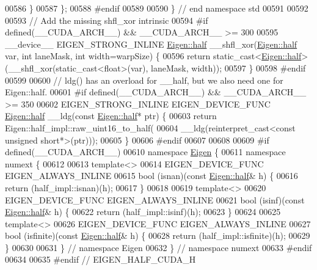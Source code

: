 \begin{DoxyCode}
00586   \}
00587 \};
00588 \textcolor{preprocessor}{#endif}
00589 
00590 \} \textcolor{comment}{// end namespace std}
00591 
00592 
00593 \textcolor{comment}{// Add the missing shfl\_xor intrinsic}
00594 \textcolor{preprocessor}{#if defined(\_\_CUDA\_ARCH\_\_) && \_\_CUDA\_ARCH\_\_ >= 300}
00595 \_\_device\_\_ EIGEN\_STRONG\_INLINE \hyperlink{struct_eigen_1_1half}{Eigen::half} \_\_shfl\_xor(\hyperlink{struct_eigen_1_1half}{Eigen::half} var, \textcolor{keywordtype}{int} laneMask, \textcolor{keywordtype}{
      int} width=warpSize) \{
00596   \textcolor{keywordflow}{return} \textcolor{keyword}{static\_cast<}\hyperlink{struct_eigen_1_1half}{Eigen::half}\textcolor{keyword}{>}(\_\_shfl\_xor(static\_cast<float>(var), laneMask, width));
00597 \}
00598 \textcolor{preprocessor}{#endif}
00599 
00600 \textcolor{comment}{// ldg() has an overload for \_\_half, but we also need one for Eigen::half.}
00601 \textcolor{preprocessor}{#if defined(\_\_CUDA\_ARCH\_\_) && \_\_CUDA\_ARCH\_\_ >= 350}
00602 EIGEN\_STRONG\_INLINE EIGEN\_DEVICE\_FUNC \hyperlink{struct_eigen_1_1half}{Eigen::half} \_\_ldg(\textcolor{keyword}{const} 
      \hyperlink{struct_eigen_1_1half}{Eigen::half}* ptr) \{
00603   \textcolor{keywordflow}{return} Eigen::half\_impl::raw\_uint16\_to\_half(
00604       \_\_ldg(reinterpret\_cast<const unsigned short*>(ptr)));
00605 \}
00606 \textcolor{preprocessor}{#endif}
00607 
00608 
00609 \textcolor{preprocessor}{#if defined(\_\_CUDA\_ARCH\_\_)}
00610 \textcolor{keyword}{namespace }\hyperlink{namespace_eigen}{Eigen} \{
00611 \textcolor{keyword}{namespace }numext \{
00612 
00613 \textcolor{keyword}{template}<>
00614 EIGEN\_DEVICE\_FUNC EIGEN\_ALWAYS\_INLINE
00615 bool (isnan)(\textcolor{keyword}{const} \hyperlink{struct_eigen_1_1half}{Eigen::half}& h) \{
00616   \textcolor{keywordflow}{return} (half\_impl::isnan)(h);
00617 \}
00618 
00619 \textcolor{keyword}{template}<>
00620 EIGEN\_DEVICE\_FUNC EIGEN\_ALWAYS\_INLINE
00621 bool (isinf)(\textcolor{keyword}{const} \hyperlink{struct_eigen_1_1half}{Eigen::half}& h) \{
00622   \textcolor{keywordflow}{return} (half\_impl::isinf)(h);
00623 \}
00624 
00625 \textcolor{keyword}{template}<>
00626 EIGEN\_DEVICE\_FUNC EIGEN\_ALWAYS\_INLINE
00627 bool (isfinite)(\textcolor{keyword}{const} \hyperlink{struct_eigen_1_1half}{Eigen::half}& h) \{
00628   \textcolor{keywordflow}{return} (half\_impl::isfinite)(h);
00629 \}
00630 
00631 \} \textcolor{comment}{// namespace Eigen}
00632 \}  \textcolor{comment}{// namespace numext}
00633 \textcolor{preprocessor}{#endif}
00634 
00635 \textcolor{preprocessor}{#endif // EIGEN\_HALF\_CUDA\_H}
\end{DoxyCode}
